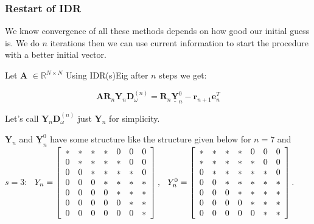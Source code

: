 \documentclass[mathserif]{beamer}
\begin{document}
\begin{frame}
\frametitle{Restart of IDR}
We know convergence of all these methods depends on how good our initial guess is. We do $n$ iterations then we can use current information to start the procedure with a better initial vector. \\ 
\vspace{.1in}

\pause
Let $\mathbf{A}$ $ \in \mathbb{R}^{N \times N}$ Using IDR(s)Eig after $n$ steps we get:

\[\mathbf{A}\mathbf{R}_n\mathbf{Y}_n\mathbf{D}_\omega^{(n)}=\mathbf{R}_n\underline{\mathbf{Y}}_n^0-\mathbf{r}_{n+1}\mathbf{e}_n^T\]

Let's call $\mathbf{Y}_n\mathbf{D}_\omega^{(n)}$ just $\mathbf{Y}_n$ for simplicity.

\pause 
$\mathbf{Y}_n$ and $\underline{\mathbf{Y}}_n^0$ have some structure like the structure given below for $n=7$ and $s=3$:
\mbox{
$
Y_n=\left[
\begin{array}{cccccccc}
* & * & * & *  & 0 & 0 & 0 \\
0 & *  & *  & *  & * & 0 & 0 \\
0 & 0  & *  & *  & * & * & 0 \\
0 & 0  & 0  & *  & * & * & * \\
0 & 0  & 0  & 0  & * & * & * \\
0 & 0  & 0  & 0  & 0 & * & *\\
0 & 0  & 0  & 0  & 0 & 0 & * \\
\end{array}
\right], \hspace{.1in}
Y_n^0=\left[
\begin{array}{cccccccc}
* & * & * & *  & 0 & 0 & 0 \\
* & *  & *  & *  & * & 0 & 0 \\
0 & *  & *  & *  & * & * & 0 \\
0 & 0  & *  & *  & * & * & * \\
0 & 0  & 0  & *  & * & * & * \\
0 & 0  & 0  & 0  & * & * & *\\
0 & 0  & 0  & 0  & 0 & * & * \\
\end{array}
\right].
$
}
\end{frame}
\end{document}
